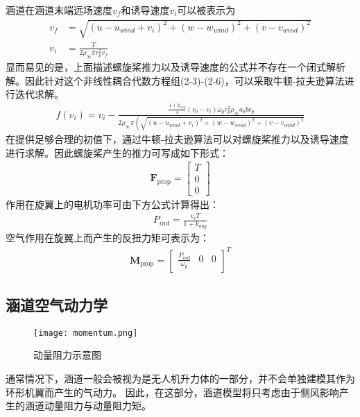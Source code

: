 涵道在涵道末端远场速度$v_{f}$和诱导速度$v_{i}$可以被表示为
\begin{align}
    v_{f}&=\sqrt{\left ( u-u_{wind}+v_{i}  \right )^{2}+\left (  w - w_{wind}\right ) ^{2}+\left ( v - v_{wind}\right )^{2}} \\
    v_{i}&=\frac{T}{2\rho _{\infty}\pi r_{p}^2v_{f}} 
\end{align}
显而易见的是，上面描述螺旋桨推力以及诱导速度的公式并不存在一个闭式解析解。因此针对这个非线性耦合代数方程组(2-3)-(2-6)，可以采取牛顿-拉夫逊算法进行迭代求解。
\begin{align}
    f\left(v_{i}\right)=v_{i}-\frac{\frac{1+k_{aug}}{4} \left(v_{b}-v_{i}\right) \omega _{p}r_{p}^{2}\rho _{\infty}a_{0}bc_{p}}{2 \rho _{\infty} \pi\left(\sqrt{\left ( u-u_{wind}+v_{i}  \right )^{2}+\left (  w - w_{wind}\right ) ^{2}+\left ( v - v_{wind}\right )^{2}}\right.}
\end{align}
在提供足够合理的初值下，通过牛顿-拉夫逊算法可以对螺旋桨推力以及诱导速度进行求解。因此螺旋桨产生的推力可写成如下形式：
\begin{align}
    \mathbf{F}_{\text {prop}}=\left[\begin{array}{c}
        T \\
        0 \\
        0
        \end{array}\right]
\end{align}
作用在旋翼上的电机功率可由下方公式计算得出\cite{任小璐2014涵道式无人飞行器建模与控制方法研究}：
\begin{align}
    P_{ind}=\frac{v_{i} T}{1+k_{aug}}
\end{align}
空气作用在旋翼上而产生的反扭力矩可表示为：
\begin{align}
    \mathbf{M}_{\text {prop}}=\left[\begin{array}{lll}
        \frac{P_{ind}}{\omega_{p}} & 0 & 0
        \end{array}\right]^{T}
\end{align}

\subsection{涵道空气动力学}
\begin{figure}[htbp]
    \centering
    \texttt{[image: momentum.png]}
    \caption{\label{fig:momentum}动量阻力示意图}
\end{figure}
通常情况下，涵道一般会被视为是无人机升力体的一部分，并不会单独建模其作为环形机翼而产生的气动力\cite{zhang2013new}。
因此，在这部分，涵道模型将只考虑由于侧风影响产生的涵道动量阻力与动量阻力矩。

